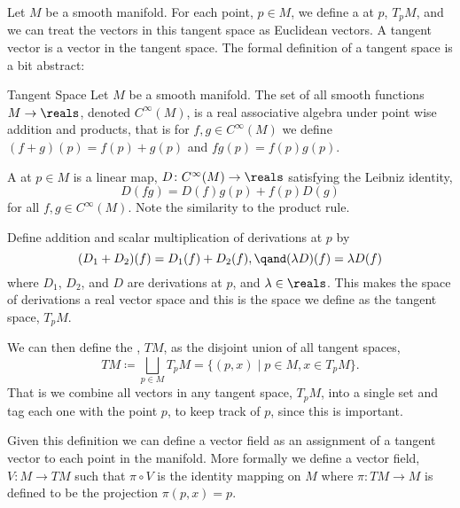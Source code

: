Let \(M\) be a smooth manifold.
For each point, \(p \in M\), we define a  at \(p\), \(T_pM\), and we can treat the vectors in this tangent space as Euclidean vectors.
A tangent vector is a vector in the tangent space.
The formal definition of a tangent space is a bit abstract:
\begin{dfn}{Tangent Space}{}
    Let \(M\) be a smooth manifold.
    The set of all smooth functions \(M \to \reals\), denoted \(C^{\infty}(M)\), is a real associative algebra under point wise addition and products, that is for \(f, g \in C^{\infty}(M)\) we define \((f + g)(p) = f(p) + g(p)\) and \(fg(p) = f(p)g(p)\).
    
    A  at \(p \in M\) is a linear map, \(D \colon C^{\infty}(M) \to \reals\) satisfying the Leibniz identity,
    \begin{equation}
        D(fg) = D(f)g(p) + f(p)D(g)
    \end{equation}
    for all \(f, g \in C^{\infty}(M)\).
    Note the similarity to the product rule.
    
    Define addition and scalar multiplication of derivations at \(p\) by
    \begin{equation}
        (D_1 + D_2)(f) = D_1(f) + D_2(f), \qand (\lambda D)(f) = \lambda D(f)
    \end{equation}
    where \(D_1\), \(D_2\), and \(D\) are derivations at \(p\), and \(\lambda \in \reals\).
    This makes the space of derivations a real vector space and this is the space we define as the tangent space, \(T_pM\).
    
    We can then define the , \(TM\), as the disjoint union of all tangent spaces,
    \begin{equation}
        TM \coloneqq \bigsqcup_{p \in M} T_pM = \{(p, x) \mid p \in M, x \in T_pM\}.
    \end{equation}
    That is we combine all vectors in any tangent space, \(T_pM\), into a single set and tag each one with the point \(p\), to keep track of \(p\), since this is important.
\end{dfn}

Given this definition we can define a vector field as an assignment of a tangent vector to each point in the manifold.
More formally we define a vector field, \(V \colon M \to TM\) such that \(\pi \circ V\) is the identity mapping on \(M\) where \(\pi \colon TM \to M\) is defined to be the projection \(\pi(p, x) = p\).
